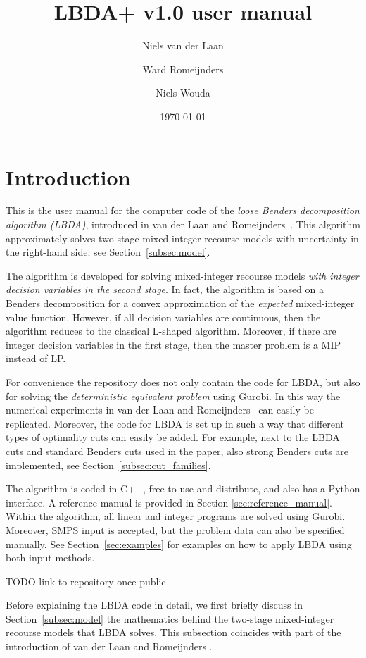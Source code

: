 \documentclass[12pt, english]{article}
\title{LBDA+ v1.0 user manual}
\author{
	Niels van der Laan
	\and
	Ward Romeijnders
	\and
	Niels Wouda
}
\date{\today}
\begin{document}
	
\maketitle
\tableofcontents

\clearpage

\section{Introduction}
\label{sec:introduction}
This is the user manual for the computer code of the \emph{loose Benders decomposition algorithm (LBDA)}, introduced in van der Laan and Romeijnders~\cite{vanderLaan2020}. This algorithm approximately solves two-stage mixed-integer recourse models with uncertainty in the right-hand side; see Section~\ref{subsec:model}. 

The algorithm is developed for solving mixed-integer recourse models \emph{with integer decision variables in the second stage}. In fact, the algorithm is based on a Benders decomposition for a convex approximation of the \emph{expected} mixed-integer value function. However, if all decision variables are continuous, then the algorithm reduces to the classical L-shaped algorithm. Moreover, if there are integer decision variables in the first stage, then the master problem is a MIP instead of LP.

For convenience the repository does not only contain the code for LBDA, but also for solving the \emph{deterministic equivalent problem} using Gurobi. In this way the numerical experiments in van der Laan and Romeijnders~\cite{vanderLaan2020} can easily be replicated. Moreover, the code for LBDA is set up in such a way that different types of optimality cuts can easily be added. For example, next to the LBDA cuts and standard Benders cuts used in the paper, also strong Benders cuts are implemented, see Section~\ref{subsec:cut_families}.

The algorithm is coded in C++, free to use and distribute, and also has a Python interface. A reference manual is provided in Section \ref{sec:reference_manual}. Within the algorithm, all linear and integer programs are solved using Gurobi. Moreover, SMPS input is accepted, but the problem data can also be specified manually. See Section~\ref{sec:examples} for examples on how to apply LBDA using both input methods. 

TODO link to repository once public

Before explaining the LBDA code in detail, we first briefly discuss in Section~\ref{subsec:model} the mathematics behind the two-stage mixed-integer recourse models that LBDA solves. This subsection coincides with part of the introduction of van der Laan and Romeijnders \cite{vanderLaan2020}.
\end{document}
